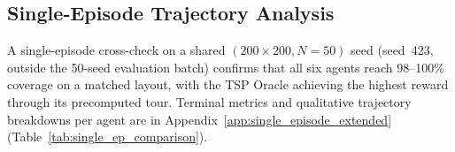 \subsection{Single-Episode Trajectory Analysis}
\label{sec:single_episode}

A single-episode cross-check on a shared $(200{\times}200, N{=}50)$ seed (seed~423, outside the 50-seed evaluation batch) confirms that all six agents reach 98--100\% coverage on a matched layout, with the TSP Oracle achieving the highest reward through its precomputed tour. Terminal metrics and qualitative trajectory breakdowns per agent are in Appendix~\ref{app:single_episode_extended} (Table~\ref{tab:single_ep_comparison}).
